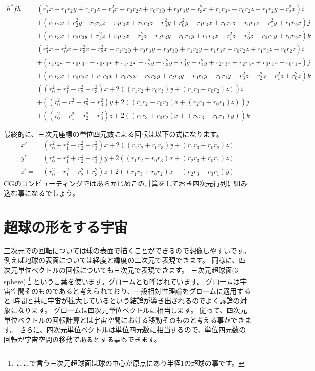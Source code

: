 \documentclass[a4paper,12pt,notitlepage]{jsreport}
\begin{document}
\begin{equation}
  \begin{split}
    h^*fh=~&(r_1^2x+r_1r_2y+r_1r_3z+r_0^2x-r_0r_2z+r_0r_3y+r_0r_3y-r_3^2x+r_1r_3z-r_0r_2z+r_1r_2y-r_2^2x)i\\
    &+(r_1r_2x+r_2^2y+r_2r_3z-r_0r_3x+r_2r_3z-r_3^2y+r_0^2y-r_0r_3x+r_0r_1z+r_0r_1z-r_1^2y+r_1r_2x)j\\
    &+(r_1r_3x+r_2r_3y+r_3^2z+r_0r_2x-r_2^2z+r_2r_3y-r_0r_1y+r_1r_3x-r_1^2z+r_0^2z-r_0r_1y+r_0r_2x)k\\
    =~&(r_1^2x+r_0^2x-r_3^2x-r_2^2x+r_1r_2y+r_0r_3y+r_0r_3y+r_1r_2y+r_1r_3z-r_0r_2z+r_1r_3z-r_0r_2z)i\\
    &+(r_1r_2x-r_0r_3x-r_0r_3x+r_1r_2x+r_2^2y-r_3^2y+r_0^2y-r_1^2y+r_2r_3z+r_2r_3z+r_0r_1z+r_0r_1z)j\\
    &+(r_1r_3x+r_0r_2x+r_1r_3x+r_0r_2x+r_2r_3y+r_2r_3y-r_0r_1y-r_0r_1y+r_3^2z-r_2^2z-r_1^2z+r_0^2z)k\\
    =~&((r_0^2+r_1^2-r_2^2-r_3^2)x+2((r_1r_2+r_0r_3)y+(r_1r_3-r_0r_2)z))i\\
    &+((r_0^2-r_1^2+r_2^2-r_3^2)y+2((r_1r_2-r_0r_3)x+(r_2r_3+r_0r_1)z))j\\
    &+((r_0^2-r_1^2-r_2^2+r_3^2)z+2((r_1r_3+r_0r_2)x+(r_2r_3-r_0r_1)y))k
  \end{split}
\end{equation}

最終的に、三次元座標の単位四元数による回転は以下の式になります。
\begin{equation}
  \begin{split}
    x'=~&(r_0^2+r_1^2-r_2^2-r_3^2)x+2((r_1r_2+r_0r_3)y+(r_1r_3-r_0r_2)z)\\
    y'=~&(r_0^2-r_1^2+r_2^2-r_3^2)y+2((r_1r_2-r_0r_3)x+(r_2r_3+r_0r_1)z)\\
    z'=~&(r_0^2-r_1^2-r_2^2+r_3^2)z+2((r_1r_3+r_0r_2)x+(r_2r_3-r_0r_1)y)
  \end{split}
\end{equation}
CGのコンピューティングではあらかじめこの計算をしておき四次元行列に組み込む事になるでしょう。

\section{超球の形をする宇宙}

三次元での回転については球の表面で描くことができるので想像しやすいです。
例えば地球の表面については経度と緯度の二次元で表現できます。
同様に、四次元単位ベクトルの回転についても三次元で表現できます。
三次元超球面(3-sphere)
\footnote{ここで言う三次元超球面は球の中心が原点にあり半径1の超球の事です。}
という言葉を使います。グロームとも呼ばれています。
グロームは宇宙空間そのものであると考えられており、一般相対性理論をグロームに適用すると
時間と共に宇宙が拡大しているという結論が導き出されるのでよく議論の対象になります。
グロームは四次元単位ベクトルに相当します。
従って、四次元単位ベクトルの回転計算とは宇宙空間における移動そのものと考える事ができます。
さらに、四次元単位ベクトルは単位四元数に相当するので、単位四元数の回転が宇宙空間の移動であるとする事もできます。
\end{document}
